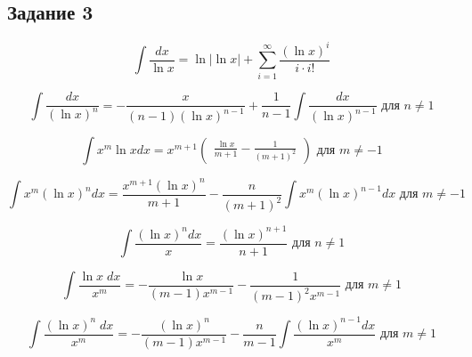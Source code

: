 \documentclass[a4paper,12pt]{article} %
\begin{document}
\subsection{Задание 3}
    \large$$\int\frac{dx}{\ln x}=\ln\left | \ln x \right|+\sum_{i=1}^{\infty}\frac{(\ln x)^{i}}{i \cdot i!}$$
    
    $$\int \frac{dx}{(\ln x)^{n}}=-\frac{x}{(n-1)(\ln x)^{n-1}}+\frac{1}{n-1} \int\frac{dx}{(\ln x)^{n-1}}\text{ для } n\ne1$$ 
    
    $$\int x^{m}\ln x dx = x^{m+1}\begin{pmatrix}
        \frac{\ln x}{m+1}-\frac{1}{(m+1)^{2}}
    \end{pmatrix}\text{ для } m\ne-1$$
   
    $$\int x^{m}(\ln x)^{n} dx = \frac{x^{m+1}(\ln x)^n}{m+1}-\frac{n}{(m+1)^{2}}\int x^{m}(\ln x)^{n-1} dx\text{ для } m\ne-1$$
    
    $$\int \frac{(\ln x)^n dx}{x}=\frac{(\ln x)^{n+1}}{n+1}\text{ для } n\ne1$$
    
    $$\int \frac{\ln x\;dx}{x^m}=-\frac{\ln x}{(m-1)x^{m-1}}-\frac{1}{(m-1)^2x^{m-1}}\text{ для } m\ne1$$
    
    $$\int \frac{(\ln x)^n\;dx}{x^m}=-\frac{(\ln x)^n}{(m-1)x^{m-1}}-\frac{n}{m-1}\int \frac{(\ln x)^{n-1}dx}{x^m}\text{ для } m\ne1$$
\end{document}
